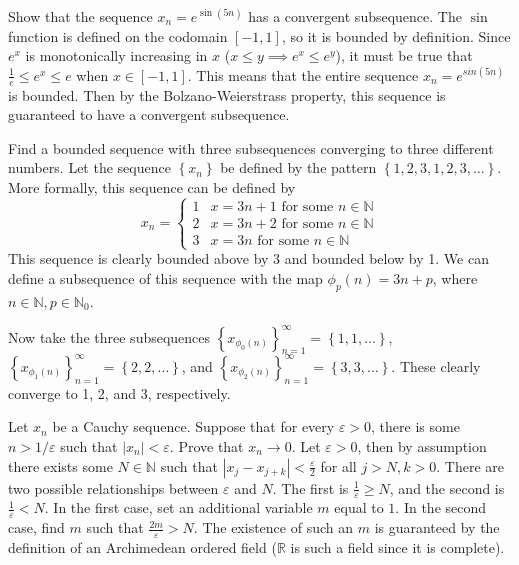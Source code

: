 \documentclass[10pt]{amsart}
\theoremstyle{plain}
\newenvironment{exercise}[1]{%
  \renewcommand\themanualtheoreminner{#1}%
  \manualtheoreminner
}{\endmanualtheoreminner}
\theoremstyle{definition}
\newcommand{\<}{\langle}
\renewcommand{\>}{\rangle}
\begin{document}
\begin{exercise}{1.4.2}
	Show that the sequence $x_n = e^{\sin(5n)}$ has a convergent subsequence.
\end{exercise}
The $\sin$ function is defined on the codomain $[-1, 1]$, so it is bounded by definition. Since $e^x$ is monotonically increasing in $x$ ($x \leq y \implies e^x \leq e^y$), it must be true that $\frac{1}{e} \leq e^x \leq e$ when $x \in [-1, 1]$. This means that the entire sequence $x_n = e^{sin(5n)}$ is bounded. Then by the Bolzano-Weierstrass property, this sequence is guaranteed to have a convergent subsequence.

\begin{exercise}{1.4.3}
	Find a bounded sequence with three subsequences converging to three different numbers.
\end{exercise}
Let the sequence $\left\{ x_n \right\}$ be defined by the pattern $\left\{ 1, 2, 3, 1, 2, 3, \dots  \right\}$. More formally, this sequence can be defined by
\[
	x_n = \begin{cases}
		1 & x = 3n + 1 \text{ for some } n \in \mathbb{N} \\
		2 & x = 3n + 2 \text{ for some } n \in \mathbb{N} \\
		3 & x = 3n \text{ for some } n \in \mathbb{N}
	\end{cases}
\]
This sequence is clearly bounded above by 3 and bounded below by 1. We can define a subsequence of this sequence with the map $\phi_p(n) = 3n + p$, where $n \in \mathbb{N}, p \in \mathbb{N}_0$.

Now take the three subsequences $\left\{ x_{\phi_0(n)} \right\}_{n=1}^\infty = \left\{ 1, 1, \dots \right\}$, $\left\{ x_{\phi_1(n)} \right\}_{n=1}^\infty = \left\{ 2, 2, \dots \right\}$, and $\left\{ x_{\phi_2(n)} \right\}_{n=1}^\infty = \left\{ 3, 3, \dots \right\}$. These clearly converge to 1, 2, and 3, respectively.

\begin{exercise}{1.4.4}
	Let $x_n$ be a Cauchy sequence. Suppose that for every $\varepsilon>0$, there is some $n>1/\varepsilon$ such that $|x_n|<\varepsilon$. Prove that $x_n\to 0$.
\end{exercise}
Let $\varepsilon>0$, then by assumption there exists some $N \in \mathbb{N}$ such that $|x_j - x_{j+k}| < \frac{\varepsilon}{2} $ for all $j > N, k > 0$. There are two possible relationships between $\varepsilon$ and $N$. The first is $\frac{1}{\varepsilon} \geq N$, and the second is $\frac{1}{\varepsilon} < N$. In the first case, set an additional variable $m$ equal to $1$. In the second case, find $m$ such that $\frac{2m}{\varepsilon} > N$. The existence of such an $m$ is guaranteed by the definition of an Archimedean ordered field ($\mathbb{R}$ is such a field since it is complete).
\end{document}
